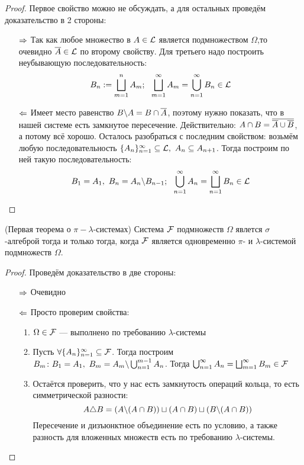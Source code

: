 \begin{proof}
	Первое свойство можно не обсуждать, а для остальных проведём доказательство в 2 стороны:
	\begin{itemize}
		\item[$\Rightarrow$] Так как любое множество в $A \in \mathcal{L}$ является подмножеством $\Omega$,то очевидно $\overline{A} \in \mathcal{L}$ по второму свойству. Для третьего надо построить неубывающую последовательность:
		\[
			B_n := \bigsqcup_{m = 1}^n A_m;\ \ \bigsqcup_{m = 1}^\infty A_m = \bigcup_{n = 1}^\infty B_n \in \mathcal{L}
		\]
		
		\item[$\Leftarrow$] Имеет место равенство $B \backslash A = B \cap \overline{A}$, поэтому нужно показать, что в нашей системе есть замкнутое пересечение. Действительно: $A \cap B = \overline{\overline{A} \cup \overline{B}}$, а потому всё хорошо. Осталось разобраться с последним свойством: возьмём любую последовательность $\{A_n\}_{n = 1}^\infty \subseteq \mathcal{L},\ A_n \subseteq A_{n + 1}$. Тогда построим по ней такую последовательность:
		\[
			B_1 = A_1,\ B_n = A_n \bs B_{n - 1};\ \ \bigcup_{n = 1}^\infty A_n = \bscup_{n = 1}^\infty B_n \in \cL
		\]
	\end{itemize}
\end{proof}

\begin{theorem} (Первая теорема о $\pi-\lambda$-системах)
	Система $\mathcal{F}$ подмножеств $\Omega$ явлется $\sigma$-алгеброй тогда и только тогда, когда $\mathcal{F}$ является одновременно $\pi$- и $\lambda$-системой подмножеств $\Omega$.
\end{theorem}

\begin{proof}
	Проведём доказательство в две стороны:
	\begin{itemize}
		\item[$\Rightarrow$] Очевидно
		
		\item[$\Leftarrow$] Просто проверим свойства:
		\begin{enumerate}
			\item $\Omega \in \mathcal{F}$ --- выполнено по требованию $\lambda$-системы
			
			\item Пусть $\forall \{A_n\}_{n = 1}^\infty \subseteq \mathcal{F}$. Тогда построим $B_m \colon B_1 = A_1,\ B_m = A_m \backslash \bigcup_{n = 1}^{m - 1} A_n$. Тогда $\bigcup_{n = 1}^\infty A_n = \bigsqcup_{m = 1}^\infty B_m \in \mathcal{F}$
			
			\item Остаётся проверить, что у нас есть замкнутость операций кольца, то есть симметрической разности:
			\[
				A \triangle B = (A \backslash (A \cap B)) \sqcup (A \cap B) \sqcup (B \backslash (A \cap B))
			\]
			Пересечение и дизъюнктное объединение есть по условию, а также разность для вложенных множеств есть по требованию $\lambda$-системы.
		\end{enumerate}
	\end{itemize}
\end{proof}

